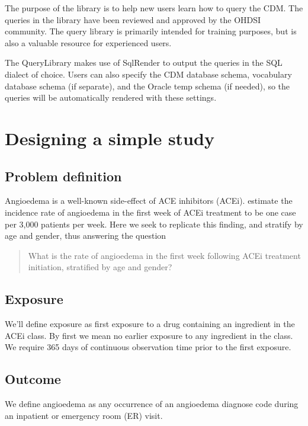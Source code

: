 \documentclass[11pt]{book}
\begin{document}
The purpose of the library is to help new users learn how to query the
CDM. The queries in the library have been reviewed and approved by the
OHDSI community. The query library is primarily intended for training
purposes, but is also a valuable resource for experienced users.

The QueryLibrary makes use of SqlRender to output the queries in the SQL
dialect of choice. Users can also specify the CDM database schema,
vocabulary database schema (if separate), and the Oracle temp schema (if
needed), so the queries will be automatically rendered with these
settings.

\section{Designing a simple study}\label{designing-a-simple-study}

\subsection{Problem definition}\label{problem-definition}

Angioedema is a well-known side-effect of ACE inhibitors (ACEi).
\citet{slater_1988} estimate the incidence rate of angioedema in the
first week of ACEi treatment to be one case per 3,000 patients per week.
Here we seek to replicate this finding, and stratify by age and gender,
thus answering the question

\begin{quote}
What is the rate of angioedema in the first week following ACEi
treatment initiation, stratified by age and gender?
\end{quote}

\subsection{Exposure}\label{exposure}

We'll define exposure as first exposure to a drug containing an
ingredient in the ACEi class. By first we mean no earlier exposure to
any ingredient in the class. We require 365 days of continuous
observation time prior to the first exposure.

\subsection{Outcome}\label{outcome}

We define angioedema as any occurrence of an angioedema diagnose code
during an inpatient or emergency room (ER) visit.
\end{document}
